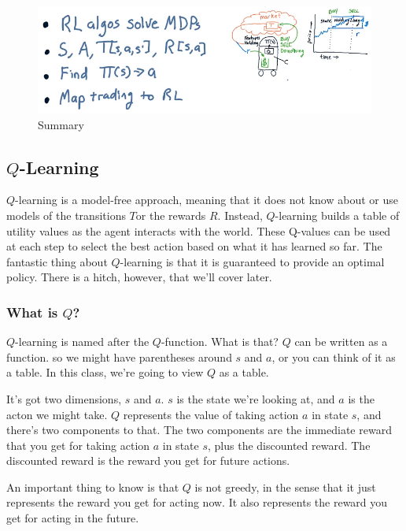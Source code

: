 \documentclass[12pt]{article}
\begin{document}
\begin{figure}[!ht]
\centering
\includegraphics[scale=0.4]{fig/fig103}
\caption{Summary}
\end{figure}

\subsection{$Q$-Learning}

$Q$-learning is a model-free approach, meaning that it does not know about or use models of the transitions $T$or the rewards $R$. Instead, $Q$-learning builds a table of utility values as the agent interacts with the world. These Q-values can be used at each step to select the best action based on what it has learned so far. The fantastic thing about $Q$-learning is that it is guaranteed to provide an optimal policy. There is a hitch, however, that we'll cover later. 

\subsubsection{What is $Q$?}

$Q$-learning is named after the $Q$-function. What is that? $Q$ can be written as a function. so we might have parentheses around $s$ and $a$, or you can think of it as a table. In this class, we're going to view $Q$ as a table. 

It's got two dimensions, $s$ and $a$. $s$ is the state we're looking at, and $a$ is the acton we might take. $Q$ represents the value of taking action $a$ in state $s$, and there's two components to that. The two components are the immediate reward that you get for taking action $a$ in state $s$, plus the discounted reward. The discounted reward is the reward you get for future actions. 

An important thing to know is that $Q$ is not greedy, in the sense that it just represents the reward you get for acting now. It also represents the reward you get for acting in the future. 
\end{document}
